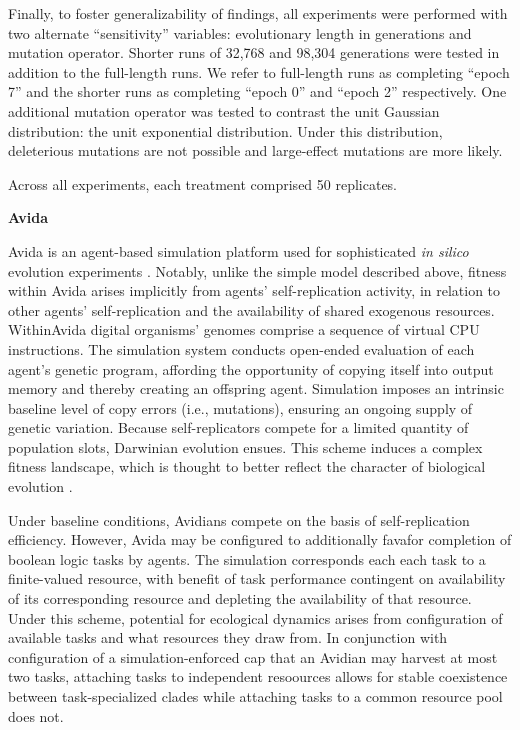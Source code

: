 Finally, to foster generalizability of findings, all experiments were performed with two alternate ``sensitivity'' variables: evolutionary length in generations and mutation operator.
Shorter runs of 32,768 and 98,304 generations were tested in addition to the full-length runs.
We refer to full-length runs as completing ``epoch 7'' and the shorter runs as completing ``epoch 0'' and ``epoch 2'' respectively.
One additional mutation operator was tested to contrast the unit Gaussian distribution: the unit exponential distribution.
Under this distribution, deleterious mutations are not possible and large-effect mutations are more likely.

Across all experiments, each treatment comprised 50 replicates.

\textbf{Avida}

Avida is an agent-based simulation platform used for sophisticated \textit{in silico} evolution experiments \citep{ofria2004avida}.
Notably, unlike the simple model described above, fitness within Avida arises implicitly from agents' self-replication activity, in relation to other agents' self-replication and the availability of shared exogenous resources.
WithinAvida digital organisms' genomes comprise a sequence of virtual CPU instructions.
The simulation system conducts open-ended evaluation of each agent's genetic program, affording the opportunity of copying itself into output memory and thereby creating an offspring agent.
Simulation imposes an intrinsic baseline level of copy errors (i.e., mutations), ensuring an ongoing supply of genetic variation.
Because self-replicators compete for a limited quantity of population slots, Darwinian evolution ensues.
This scheme induces a complex fitness landscape, which is thought to better reflect the character of biological evolution \citep{adami2006digital}.

Under baseline conditions, Avidians compete on the basis of self-replication efficiency.
However, Avida may be configured to additionally favafor completion of boolean logic tasks by agents.
The simulation corresponds each each task to a finite-valued resource, with benefit of task performance contingent on availability of its corresponding resource and depleting the availability of that resource.
Under this scheme, potential for ecological dynamics arises from configuration of available tasks and what resources they draw from.
In conjunction with configuration of a simulation-enforced cap that an Avidian may harvest at most two tasks, attaching tasks to independent resoources allows for stable coexistence between task-specialized clades while attaching tasks to a common resource pool does not.

